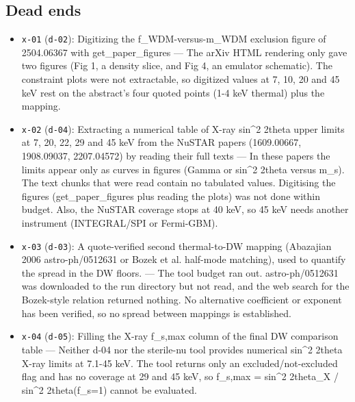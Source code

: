 \documentclass[11pt,a4paper]{article}
\begin{document}
\subsection{Dead ends}
\begin{itemize}
  \item \texttt{x-01} (\texttt{d-02}): Digitizing the f\_WDM-versus-m\_WDM exclusion figure of 2504.06367 with get\_paper\_figures --- The arXiv HTML rendering only gave two figures (Fig 1, a density slice, and Fig 4, an emulator schematic). The constraint plots were not extractable, so digitized values at 7, 10, 20 and 45 keV rest on the abstract's four quoted points (1-4 keV thermal) plus the mapping.
  \item \texttt{x-02} (\texttt{d-04}): Extracting a numerical table of X-ray sin\textasciicircum{}2 2theta upper limits at 7, 20, 22, 29 and 45 keV from the NuSTAR papers (1609.00667, 1908.09037, 2207.04572) by reading their full texts --- In these papers the limits appear only as curves in figures (Gamma or sin\textasciicircum{}2 2theta versus m\_s). The text chunks that were read contain no tabulated values. Digitising the figures (get\_paper\_figures plus reading the plots) was not done within budget. Also, the NuSTAR coverage stops at 40 keV, so 45 keV needs another instrument (INTEGRAL/SPI or Fermi-GBM).
  \item \texttt{x-03} (\texttt{d-03}): A quote-verified second thermal-to-DW mapping (Abazajian 2006 astro-ph/0512631 or Bozek et al. half-mode matching), used to quantify the spread in the DW floors. --- The tool budget ran out. astro-ph/0512631 was downloaded to the run directory but not read, and the web search for the Bozek-style relation returned nothing. No alternative coefficient or exponent has been verified, so no spread between mappings is established.
  \item \texttt{x-04} (\texttt{d-05}): Filling the X-ray f\_s,max column of the final DW comparison table --- Neither d-04 nor the sterile-nu tool provides numerical sin\textasciicircum{}2 2theta X-ray limits at 7.1-45 keV. The tool returns only an excluded/not-excluded flag and has no coverage at 29 and 45 keV, so f\_s,max = sin\textasciicircum{}2 2theta\_X / sin\textasciicircum{}2 2theta(f\_s=1) cannot be evaluated.
\end{itemize}
\end{document}
